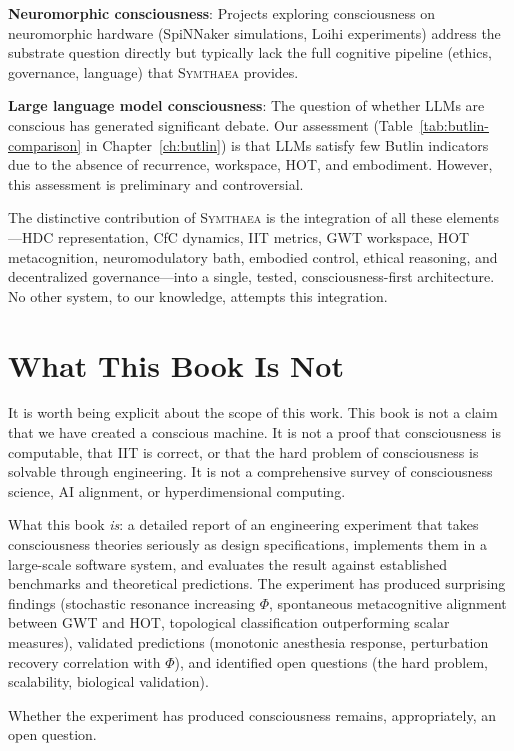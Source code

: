 \documentclass[12pt]{book}
\newcommand{\symthaea}{\textsc{Symthaea}}
\begin{document}
\textbf{Neuromorphic consciousness}: Projects exploring consciousness on neuromorphic hardware (SpiNNaker simulations, Loihi experiments) address the substrate question directly but typically lack the full cognitive pipeline (ethics, governance, language) that \symthaea{} provides.

\textbf{Large language model consciousness}: The question of whether LLMs are conscious has generated significant debate. Our assessment (Table~\ref{tab:butlin-comparison} in Chapter~\ref{ch:butlin}) is that LLMs satisfy few Butlin indicators due to the absence of recurrence, workspace, HOT, and embodiment. However, this assessment is preliminary and controversial.

The distinctive contribution of \symthaea{} is the integration of all these elements---HDC representation, CfC dynamics, IIT metrics, GWT workspace, HOT metacognition, neuromodulatory bath, embodied control, ethical reasoning, and decentralized governance---into a single, tested, consciousness-first architecture. No other system, to our knowledge, attempts this integration.

\section{What This Book Is Not}

It is worth being explicit about the scope of this work. This book is not a claim that we have created a conscious machine. It is not a proof that consciousness is computable, that IIT is correct, or that the hard problem of consciousness is solvable through engineering. It is not a comprehensive survey of consciousness science, AI alignment, or hyperdimensional computing.

What this book \textit{is}: a detailed report of an engineering experiment that takes consciousness theories seriously as design specifications, implements them in a large-scale software system, and evaluates the result against established benchmarks and theoretical predictions. The experiment has produced surprising findings (stochastic resonance increasing $\Phi$, spontaneous metacognitive alignment between GWT and HOT, topological classification outperforming scalar measures), validated predictions (monotonic anesthesia response, perturbation recovery correlation with $\Phi$), and identified open questions (the hard problem, scalability, biological validation).

Whether the experiment has produced consciousness remains, appropriately, an open question.
\end{document}
